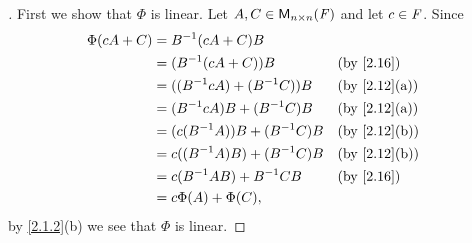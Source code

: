 \begin{proof}[]
  First we show that \(\Phi\) is linear.
  Let \(A, C \in \mathsf{M}_{{n} \times n}({\mathit{F}})\) and let \(c \in \mathit{F}\).
  Since
  \begin{align*}
    \Phi(cA + C) & = B^{-1} (cA + C) B                                               \\
                 & = (B^{-1} (cA + C)) B             &  & \text{(by \cref{2.16})}    \\
                 & = ((B^{-1} c A) + (B^{-1} C)) B   &  & \text{(by \cref{2.12}(a))} \\
                 & = (B^{-1} c A) B + (B^{-1} C) B   &  & \text{(by \cref{2.12}(a))} \\
                 & = (c (B^{-1} A)) B + (B^{-1} C) B &  & \text{(by \cref{2.12}(b))} \\
                 & = c ((B^{-1} A) B) + (B^{-1} C) B &  & \text{(by \cref{2.12}(b))} \\
                 & = c (B^{-1} A B) + B^{-1} CB      &  & \text{(by \cref{2.16})}    \\
                 & = c \Phi(A) + \Phi(C),
  \end{align*}
  by \cref{2.1.2}(b) we see that \(\Phi\) is linear.


\end{proof}
